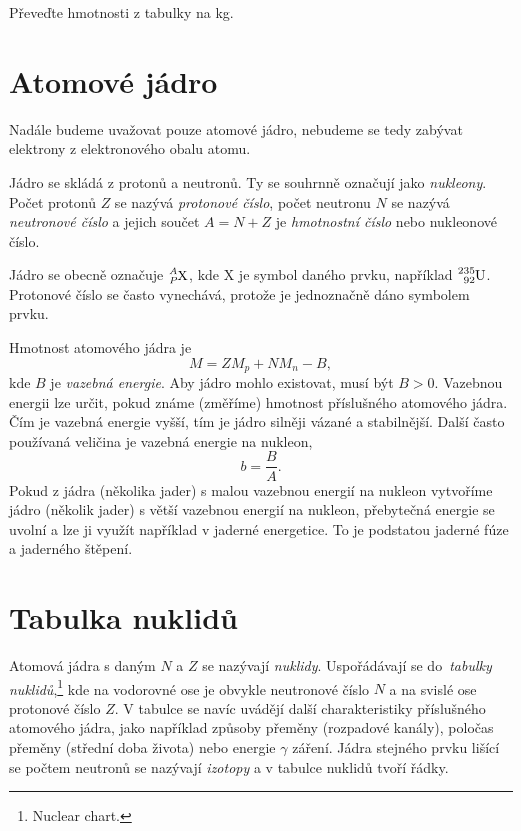 \documentclass[a4paper,12pt,oneside]{article}
\theoremstyle{red}
\begin{document}
\begin{task}
    Převeďte hmotnosti z tabulky na kg.
\end{task}

\section{Atomové jádro}
    Nadále budeme uvažovat pouze atomové jádro, nebudeme se tedy zabývat elektrony z elektronového obalu atomu.

    Jádro se skládá z protonů a neutronů. Ty se souhrnně označují jako \emph{nukleony}.
    Počet protonů $Z$ se nazývá \emph{protonové číslo},
    počet neutronu $N$ se nazývá \emph{neutronové číslo}
    a jejich součet $A=N+Z$ je \emph{hmotnostní číslo} nebo nukleonové číslo.

    Jádro se obecně označuje $\ce{^{\it A}_{\it P}X}$, kde X je symbol daného prvku, například $\ce{^{235}_{92}U}$.
    Protonové číslo se často vynechává, protože je jednoznačně dáno symbolem prvku.

    Hmotnost atomového jádra je
    \begin{equation}
        M=ZM_{p}+NM_{n}-B,
    \end{equation}
    kde $B$ je \emph{vazebná energie}.
    Aby jádro mohlo existovat, musí být $B>0$.
    Vazebnou energii lze určit, pokud známe (změříme) hmotnost příslušného atomového jádra.
    Čím je vazebná energie vyšší, tím je jádro silněji vázané a stabilnější.
    Další často používaná veličina je vazebná energie na nukleon,
    \begin{equation}
        b=\frac{B}{A}.
    \end{equation}
    Pokud z jádra (několika jader) s malou vazebnou energií na nukleon vytvoříme jádro (několik jader) s větší vazebnou energií na nukleon, přebytečná energie se uvolní a lze ji využít například v jaderné energetice.
    To je podstatou jaderné fúze a jaderného štěpení.

\section{Tabulka nuklidů}
    Atomová jádra s daným $N$ a $Z$ se nazývají \emph{nuklidy}.
    Uspořádávají se do~\emph{tabulky nuklidů},\footnote{Nuclear chart.} kde na vodorovné ose je obvykle neutronové číslo $N$ a na svislé ose protonové číslo $Z$.
    V tabulce se navíc uvádějí další charakteristiky příslušného atomového jádra, jako například způsoby přeměny (rozpadové kanály), poločas přeměny (střední doba života) nebo energie $\gamma$ záření.
    Jádra stejného prvku lišící se počtem neutronů se nazývají \emph{izotopy} a v tabulce nuklidů tvoří řádky.
\end{document}
